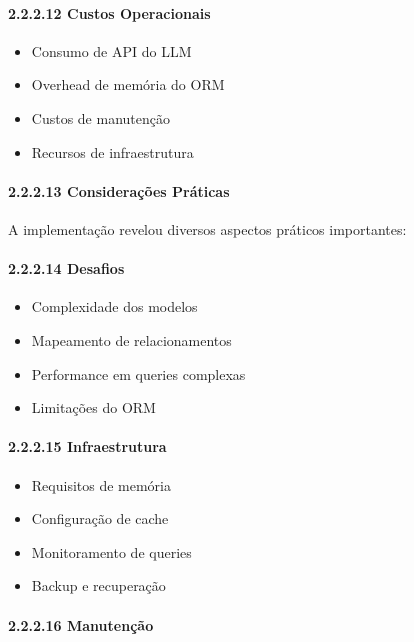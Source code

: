 \documentclass[
]{article}
\providecommand{\tightlist}{%
  \setlength{\itemsep}{0pt}\setlength{\parskip}{0pt}}
\begin{document}
\paragraph{2.2.2.12 Custos Operacionais}\label{custos-operacionais}

\begin{itemize}
\tightlist
\item
  Consumo de API do LLM
\item
  Overhead de memória do ORM
\item
  Custos de manutenção
\item
  Recursos de infraestrutura
\end{itemize}

\paragraph{2.2.2.13 Considerações
Práticas}\label{considerauxe7uxf5es-pruxe1ticas}

A implementação revelou diversos aspectos práticos importantes:

\paragraph{2.2.2.14 Desafios}\label{desafios}

\begin{itemize}
\tightlist
\item
  Complexidade dos modelos
\item
  Mapeamento de relacionamentos
\item
  Performance em queries complexas
\item
  Limitações do ORM
\end{itemize}

\paragraph{2.2.2.15 Infraestrutura}\label{infraestrutura}

\begin{itemize}
\tightlist
\item
  Requisitos de memória
\item
  Configuração de cache
\item
  Monitoramento de queries
\item
  Backup e recuperação
\end{itemize}

\paragraph{2.2.2.16 Manutenção}\label{manutenuxe7uxe3o}
\end{document}
